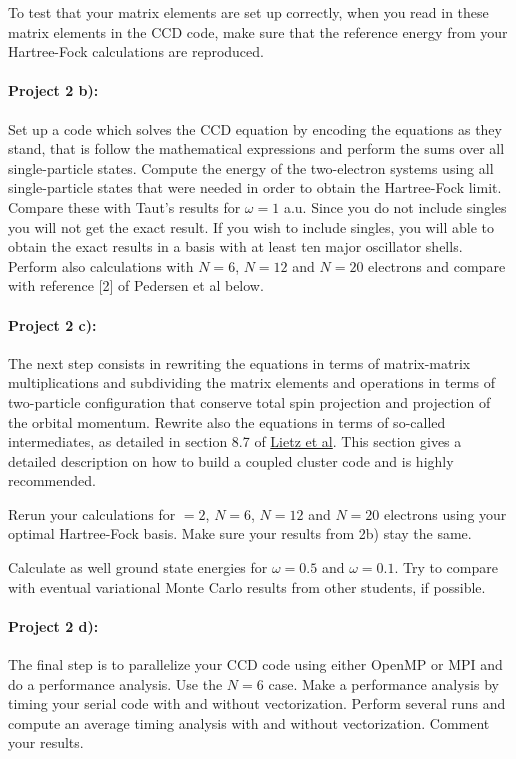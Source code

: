 \documentclass[%
oneside,                 %
final,                   %
10pt]{article}
\begin{document}
To test that your matrix elements are set up correctly, when you read in these matrix elements in the CCD code, make sure that the reference energy from your Hartree-Fock calculations are reproduced.


\paragraph{Project 2 b):}
Set up a code which solves the CCD equation by encoding the equations as they stand, that is follow the mathematical expressions and perform the sums over all single-particle states.  Compute the energy of the two-electron systems using
all single-particle states that were needed in order to obtain the Hartree-Fock limit. Compare these with Taut's results for $\omega=1$ a.u.  Since you do not include singles you will not get the exact result. If you wish to include singles, you will able to obtain the exact results in a basis with at least ten major oscillator shells.
Perform also calculations with $N=6$, $N=12$ and $N=20$ electrons and compare with reference [2] of Pedersen et al below.

\paragraph{Project 2 c):}
The next step consists in rewriting the equations in terms of matrix-matrix multiplications and subdividing
the matrix elements and operations in terms of two-particle configuration that conserve total spin projection and projection of the orbital momentum. Rewrite also the equations in terms of so-called intermediates, as detailed
in section 8.7 of \href{{https://github.com/ManyBodyPhysics/LectureNotesPhysics/blob/master/doc/src/lnp.pdf}}{Lietz et al}.
This section gives a detailed description on how to build a coupled cluster code and is highly recommended.

Rerun your calculations for $=2$, $N=6$, $N=12$ and $N=20$ electrons using your optimal Hartree-Fock basis. Make sure your results from 2b) stay the same.

Calculate as well ground state energies for $\omega=0.5$ and $\omega=0.1$. Try to compare with eventual variational
Monte Carlo results from other students, if possible.

\paragraph{Project 2 d):}
The final step is to parallelize your CCD code using either OpenMP or MPI and do a performance analysis. Use the $N=6$ case. Make a performance analysis by timing your serial code
with and without vectorization. Perform several runs and compute an average timing analysis
with and without vectorization. Comment your results.
\end{document}
